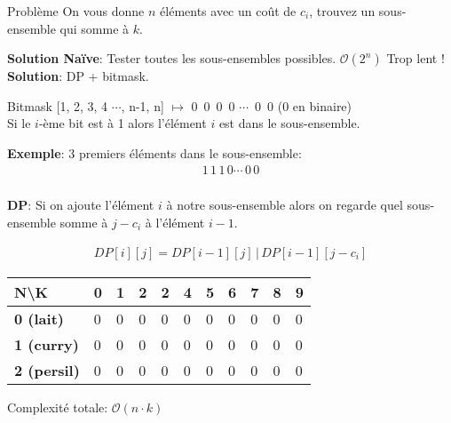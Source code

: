 
\begin{frame}
    \frametitle{\problemtitle}
    \begin{block}
        {Problème} On vous donne $n$ éléments avec un coût de $c_i$, trouvez un sous-ensemble qui somme à $k$.
    \end{block}
    \pause
    \textbf{Solution Naïve}: Tester toutes les sous-ensembles possibles. $\mathcal{O}(2^n)$ Trop lent ! \\
    \pause
    \textbf{Solution}: DP + bitmask. \\
    \pause

    \begin{block}{Bitmask}
        [1, 2, 3, 4 $\cdots$, n-1, n] $\mapsto$ 0\, 0\, 0\, 0 $\cdots$\, 0\, 0 (0 en binaire) \\
        Si le $i$-ème bit est à 1 alors l'élément $i$ est dans le sous-ensemble.
    \end{block}
    \pause
    \textbf{Exemple}: 3 premiers éléments dans le sous-ensemble:\\
    \begin{align*}
        1\, 1\, 1\, 0 \cdots\, 0\, 0
    \end{align*}
    \pause
\end{frame}
\begin{frame}
    \frametitle{\problemtitle}
    \textbf{DP}: Si on ajoute l'élément $i$ à notre sous-ensemble alors on regarde quel sous-ensemble somme à $j-c_i$ à l'élément $i-1$.
    
    \begin{align*}
        DP[i][j] = DP[i-1][j] \,|\, DP[i-1][j-c_i]
    \end{align*}
    
    \begin{table}[]
      \begin{tabular}{|l|l|l|l|l|l|l|l|l|l|l|}
      \hline
      \textbf{N\textbackslash{}K} & \textbf{0} & \textbf{1} & \textbf{2} & \textbf{2} & \textbf{4} & \textbf{5} & \textbf{6} & \textbf{7} & \textbf{8} & \textbf{9} \\ \hline
      \textbf{0 (lait)}   & 0 & 0 & 0 & 0 & 0 & 0 & 0 & 0 & 0 & 0 \\ \hline
      \textbf{1 (curry)}  & 0 & 0 & 0 & 0 & 0 & 0 & 0 & 0 & 0 & 0 \\ \hline
      \textbf{2 (persil)} & 0 & 0 & 0 & 0 & 0 & 0 & 0 & 0 & 0 & 0 \\ \hline
      \end{tabular}
    \end{table}
    
    Complexité totale: $\mathcal{O}(n \cdot k)$
\end{frame}
